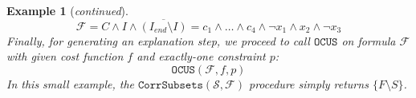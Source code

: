 \documentclass[twoside,11pt]{article}
\newcommand\m[1]{\mathcal{#1}}
\newtheorem{example}{Example}
\newcommand\comment[1]{\marginpar{\tiny #1}}
\renewcommand\comment[1]{#1}
\newcommand{\tias}[1]{{\comment{\color{blue}Tias:#1}}}
\newcommand{\emilio}[1]{{\comment{\color{red}Emilio: #1}}}
\newcommand{\bart}[1]{{\comment{\color{OliveGreen}Bart: #1}}}
\newcommand\Iend{\ensuremath{I_\mathit{end} }\xspace}
\newcommand\formula{\ensuremath{\m{F} }\xspace}
\newcommand\formulac{\ensuremath{\m{C} }\xspace}
\newcommand\formularunning{\ensuremath{C }\xspace}
\newcommand\mm[1]{\ensuremath{#1}\xspace}
\newcommand\call[1]{\mm{\texttt{#1}}}
\newcommand\sat{\texttt{{SAT}}\xspace}
\newcommand\grow{\mm{\call{Grow}}}
\newcommand\comus{\mm{\call{OCUS}}}
\newcommand\corrsubsets{\mm{\call{CorrSubsets}}}
\begin{document}
\begin{example}[\textit{continued}]
\begin{equation}
\formula = \formularunning \land I \land \overline{(\Iend\setminus I)} =  c_1 \wedge \dots \wedge c_{4} \wedge \lnot x_1 \wedge  x_2 \wedge  \lnot x_3	%
\label{eq:explain-one-step-ocus}
\end{equation}
	Finally, for generating an explanation step, we proceed to call \comus on formula $\formula$ with given cost function $f$ and \emph{exactly-one} constraint $p$:
	\begin{equation}\comus( \formula, f, p)\end{equation}
%
	In this small example, the $\corrsubsets(\m{S}, \formula)$ procedure simply returns $\{F\setminus S\}$. 


\end{example}
\end{document}
